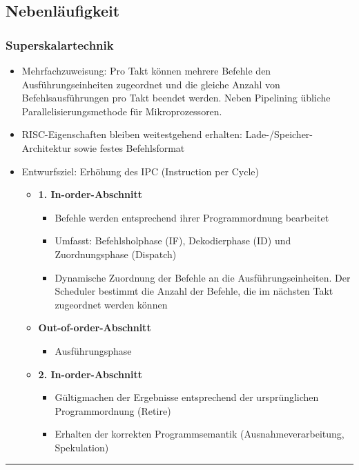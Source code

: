 \subsection{Nebenläufigkeit}
\subsubsection{Superskalartechnik}
\begin{itemize}
	\item Mehrfachzuweisung: Pro Takt können mehrere Befehle den Ausführungseinheiten zugeordnet und die gleiche Anzahl von Befehlsausführungen pro Takt beendet werden. Neben Pipelining übliche Parallelisierungsmethode für Mikroprozessoren.
	\item RISC-Eigenschaften bleiben weitestgehend erhalten: Lade-/Speicher-Architektur sowie festes Befehlsformat
	\item Entwurfsziel: Erhöhung des IPC (Instruction per Cycle)
	\begin{itemize}
		\item \textbf{1. In-order-Abschnitt}
		\begin{itemize}
			\item Befehle werden entsprechend ihrer Programmordnung bearbeitet
			\item Umfasst: Befehlsholphase (IF), Dekodierphase (ID) und Zuordnungsphase (Dispatch)
			\item Dynamische Zuordnung der Befehle an die Ausführungseinheiten. Der Scheduler bestimmt die Anzahl der Befehle, die im nächsten Takt zugeordnet werden können
		\end{itemize}
		\item \textbf{Out-of-order-Abschnitt}
		\begin{itemize}
			\item Ausführungsphase
		\end{itemize}
		\item \textbf{2. In-order-Abschnitt}
		\begin{itemize}
			\item Gültigmachen der Ergebnisse entsprechend der ursprünglichen Programmordnung (Retire)
			\item Erhalten der korrekten Programmsemantik (Ausnahmeverarbeitung, Spekulation)
		\end{itemize}
	\end{itemize}
\end{itemize}

\par\noindent\rule{\textwidth}{0.4pt}
